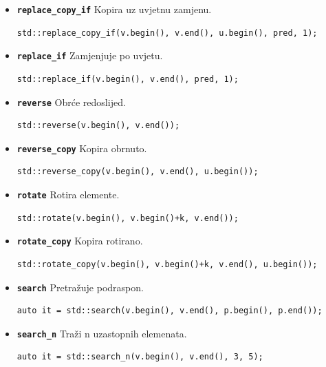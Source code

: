 \begin{itemize}
\item \textbf{\texttt{replace\_copy\_if}}\newline
Kopira uz uvjetnu zamjenu.
\begin{verbatim}
std::replace_copy_if(v.begin(), v.end(), u.begin(), pred, 1);
\end{verbatim}

\item \textbf{\texttt{replace\_if}}\newline
Zamjenjuje po uvjetu.
\begin{verbatim}
std::replace_if(v.begin(), v.end(), pred, 1);
\end{verbatim}

\item \textbf{\texttt{reverse}}\newline
Obrće redoslijed.
\begin{verbatim}
std::reverse(v.begin(), v.end());
\end{verbatim}

\item \textbf{\texttt{reverse\_copy}}\newline
Kopira obrnuto.
\begin{verbatim}
std::reverse_copy(v.begin(), v.end(), u.begin());
\end{verbatim}

\item \textbf{\texttt{rotate}}\newline
Rotira elemente.
\begin{verbatim}
std::rotate(v.begin(), v.begin()+k, v.end());
\end{verbatim}

\item \textbf{\texttt{rotate\_copy}}\newline
Kopira rotirano.
\begin{verbatim}
std::rotate_copy(v.begin(), v.begin()+k, v.end(), u.begin());
\end{verbatim}

\item \textbf{\texttt{search}}\newline
Pretražuje podraspon.
\begin{verbatim}
auto it = std::search(v.begin(), v.end(), p.begin(), p.end());
\end{verbatim}

\item \textbf{\texttt{search\_n}}\newline
Traži n uzastopnih elemenata.
\begin{verbatim}
auto it = std::search_n(v.begin(), v.end(), 3, 5);
\end{verbatim}


\end{itemize}
